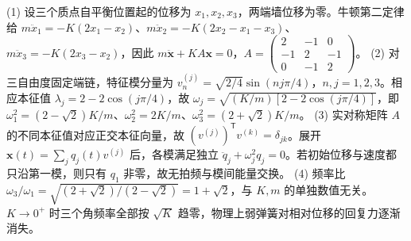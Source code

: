 (1) 设三个质点自平衡位置起的位移为 \(x_1,x_2,x_3\)，两端墙位移为零。牛顿第二定律给 \(m\ddot x_1=-K(2x_1-x_2)\)、\(m\ddot x_2=-K(2x_2-x_1-x_3)\)、\(m\ddot x_3=-K(2x_3-x_2)\)，因此 \(m\ddot{\mathbf x}+K A\mathbf x=0\)，\(A=\begin{pmatrix}2&-1&0\\-1&2&-1\\0&-1&2\end{pmatrix}\)。
(2) 对三自由度固定端链，特征模分量为 \(v^{(j)}_n=\sqrt{2/4}\sin(nj\pi/4)\)，\(n,j=1,2,3\)。相应本征值 \(\lambda_j=2-2\cos(j\pi/4)\)，故 \(\omega_j=\sqrt{(K/m)[2-2\cos(j\pi/4)]}\)，即 \(\omega_1^2=(2-\sqrt2)K/m\)、\(\omega_2^2=2K/m\)、\(\omega_3^2=(2+\sqrt2)K/m\)。
(3) 实对称矩阵 \(A\) 的不同本征值对应正交本征向量，故 \((v^{(j)})^\mathsf Tv^{(k)}=\delta_{jk}\)。展开 \(\mathbf x(t)=\sum_jq_j(t)v^{(j)}\) 后，各模满足独立 \(\ddot q_j+\omega_j^2q_j=0\)。若初始位移与速度都只沿第一模，则只有 \(q_1\) 非零，故无拍频与模间能量交换。
(4) 频率比 \(\omega_3/\omega_1=\sqrt{(2+\sqrt2)/(2-\sqrt2)}=1+\sqrt2\)，与 \(K,m\) 的单独数值无关。\(K\to0^+\) 时三个角频率全部按 \(\sqrt K\) 趋零，物理上弱弹簧对相对位移的回复力逐渐消失。
